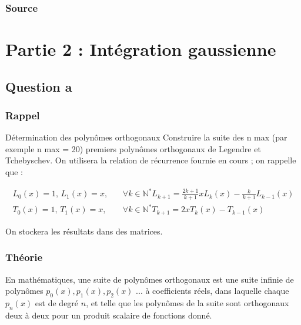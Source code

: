 \documentclass[a4paper,10pt]{report}
\newcommand{\N}{\mathbb{N}}
\begin{document}
\newpage
\subsection*{Source}

\begin{center}
	
\end{center}

\chapter*{Partie 2 : Intégration gaussienne}

\section*{Question a}

\subsection*{Rappel}

Détermination des polynômes orthogonaux Construire la suite des n max (par exemple n max = 20) premiers polynômes orthogonaux de Legendre et Tchebyschev. On utilisera la relation de récurrence fournie en cours ; on rappelle que :

\begin{eqnarray*}
L_0 (x) = 1 \text{, }L_1 (x) = x \text{, } &&\forall k \in \N^* L_{k+1} = \frac{2k+1}{k+1}xL_k (x) - \frac{k}{k+1}L_{k-1}(x)\\
T_0 (x) = 1 \text{, }T_1 (x) = x \text{, } &&\forall k \in \N^* T_{k+1} = 2xT_k (x) - T_{k-1}(x)
\end{eqnarray*}

On stockera les résultats dans des matrices.

\subsection*{Théorie}

En mathématiques, une suite de polynômes orthogonaux est une suite infinie de polynômes $p_0(x), p_1(x), p_2(x)$ ... à coefficients réels, dans laquelle chaque $p_n(x)$ est de degré $n$, et telle que les polynômes de la suite sont orthogonaux deux à deux pour un produit scalaire de fonctions donné.
\end{document}
